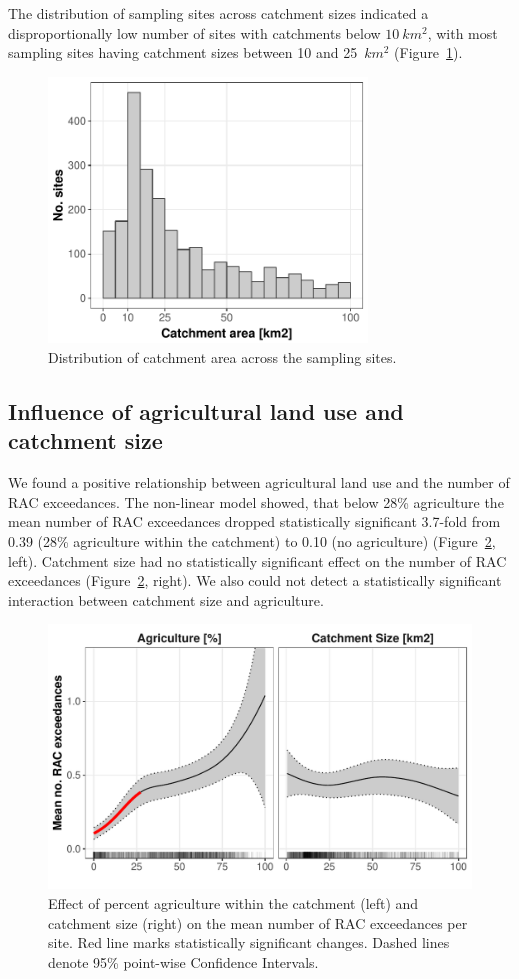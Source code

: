 \documentclass[journal=esthag,manuscript=article]{achemso}
\begin{document}
The distribution of sampling sites across catchment sizes indicated a disproportionally low number of sites with catchments below $10~km^2$, with
most sampling sites having catchment sizes between 10 and 25~$km^2$ (Figure~\ref{fig:fig3}). 


\begin{figure}[ht]
  \includegraphics[width=3.33in]{figure3.pdf}
  \caption{Distribution of catchment area across the sampling sites.}
  \label{fig:fig3}
\end{figure}


\subsection{Influence of agricultural land use and catchment size}
We found a positive relationship between agricultural land use and the number of RAC exceedances. 
The non-linear model showed, that below 28\% agriculture the mean number of RAC exceedances dropped statistically significant 3.7-fold from 0.39 (28\% agriculture within the catchment) to 0.10 (no agriculture) (Figure~\ref{fig:fig4}, left).
Catchment size had no statistically significant effect on the number of RAC exceedances (Figure~\ref{fig:fig4}, right).
We also could not detect a statistically significant interaction between catchment size and agriculture. 

\begin{figure}[ht]
  \includegraphics[width=6.5in]{figure4.pdf}
  \caption{Effect of percent agriculture within the catchment (left) and catchment size (right) on the mean number of RAC exceedances per site. Red line marks statistically significant changes. Dashed lines denote 95\% point-wise Confidence Intervals.
  }
  \label{fig:fig4}
\end{figure}
\end{document}
